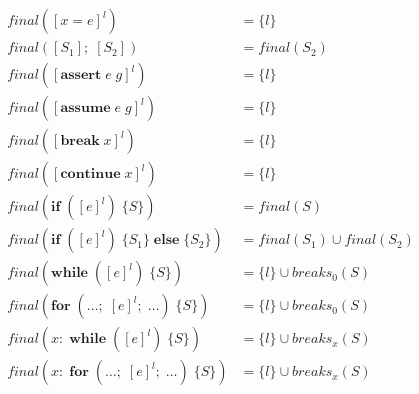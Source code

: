 \begin{align*}
    final([x = e]^l)                                             &= \{l\}                      \\
    final([S_1];\;[S_2])                                         &= final(S_2)                 \\
    final([\textbf{assert}\;e\;g]^l)                             &= \{l\}                      \\
    final([\textbf{assume}\;e\;g]^l)                             &= \{l\}                      \\
    final([\textbf{break}\;x]^l)                                 &= \{l\}                      \\
    final([\textbf{continue}\;x]^l)                              &= \{l\}                      \\
    final(\textbf{if}\;([e]^l)\;\{S\})                           &= final(S)                   \\
    final(\textbf{if}\;([e]^l)\;\{S_1\}\;\textbf{else}\;\{S_2\}) &= final(S_1) \cup final(S_2) \\
    final(\textbf{while}\;([e]^l)\;\{S\})                        &= \{l\} \cup breaks_0(S)     \\
    final(\textbf{for}\;(\dots;\;[e]^l;\;\dots)\;\{S\})          &= \{l\} \cup breaks_0(S)     \\
    final(x:\;\textbf{while}\;([e]^l)\;\{S\})                    &= \{l\} \cup breaks_x(S)     \\
    final(x:\;\textbf{for}\;(\dots;\;[e]^l;\;\dots)\;\{S\})      &= \{l\} \cup breaks_x(S) 
\end{align*}

